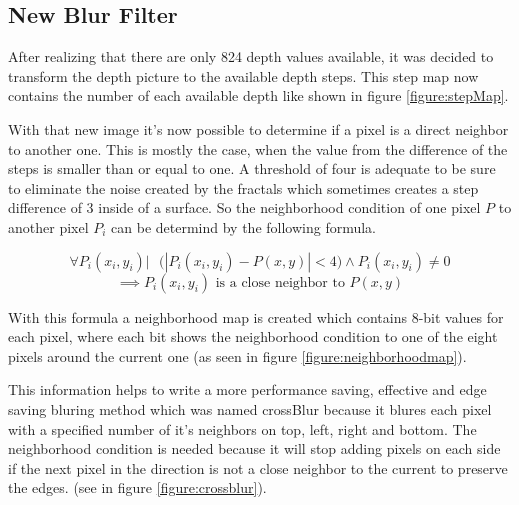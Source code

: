 


\subsection{New Blur Filter}
After realizing that there are only 824 depth values available, it was decided to transform the depth picture
to the available depth steps. This step map now contains the number of each available depth like shown in figure \vref{figure:stepMap}.


With that new image it's now possible to determine if a pixel is a direct neighbor to another one. This is mostly the case,
when the value from the difference of the steps is smaller than or equal to one. A threshold of four is adequate to be sure 
to eliminate the noise created by the fractals which sometimes creates a step difference of 3 inside of a surface. 
So the neighborhood condition of one pixel $P$ to another pixel $P_i$ can be determind by the following formula.

\[
 \forall P_i(x_i,y_i)  |\mbox{   }
 \Big(\left|P_i(x_i,y_i)-P(x,y)\right|<4 \Big) \wedge  P_i(x_i,y_i) \neq 0 %
\]
\[
 \implies P_i(x_i,y_i) \mbox{ is a close neighbor to } P(x,y)
\]

With this formula a neighborhood map is created which contains 8-bit values for each pixel, where each bit shows the neighborhood 
condition to one of the eight pixels around the current one (as seen in figure \vref{figure:neighborhoodmap}).


This information helps to write a more performance saving, effective and edge saving bluring method which 
was named crossBlur because it blures each pixel with a specified number of it's neighbors on top, left, right and bottom.
The neighborhood condition is needed because it will stop adding pixels on each side if the next pixel in the direction 
is not a close neighbor to the current to preserve the edges. (see in figure \vref{figure:crossblur}).






